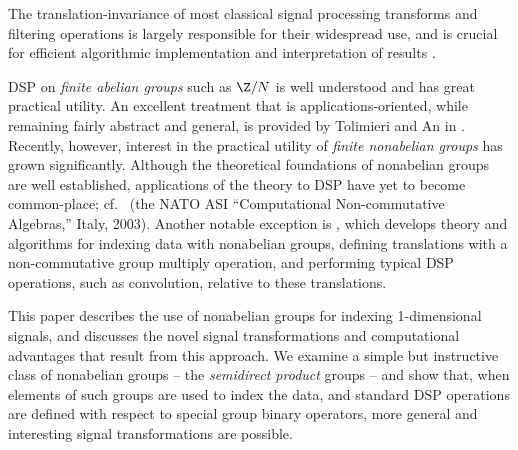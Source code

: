 
The translation-invariance of most classical signal
processing transforms and filtering operations is largely
responsible for their widespread use, and is crucial for
efficient algorithmic implementation and interpretation 
of results \cite{An:2003}. 


DSP on \emph{finite abelian groups} such as $\Z/N$ is
well understood and has great practical utility.  An
excellent treatment that is applications-oriented, while
remaining fairly abstract and general, is provided by 
Tolimieri and An in \cite{Tolimieri:1998}.
Recently, however, interest in the practical utility of
\emph{finite nonabelian groups} has grown
significantly. Although the theoretical foundations of
nonabelian groups are well established, applications of the
theory to DSP have yet to  become common-place;
cf.~\cite{Byrnes:2004} (the NATO
ASI ``Computational Non-commutative Algebras,'' Italy,
2003). Another notable exception is \cite{An:2003},
which develops theory and algorithms for
indexing data with nonabelian groups, defining translations
with a non-commutative group multiply operation, and
performing typical DSP operations, such as convolution,
relative to these translations. 

This paper describes the use of nonabelian groups
for indexing 1-dimensional signals, and discusses the
novel signal transformations and computational advantages
that result
from this approach. 
We examine a simple but instructive class of 
nonabelian groups -- the \emph{semidirect
product} groups -- and show that, when elements of such
groups are used to index the data, and standard DSP
operations are defined with respect to special group
binary operators, more general and interesting
signal transformations are possible.

%